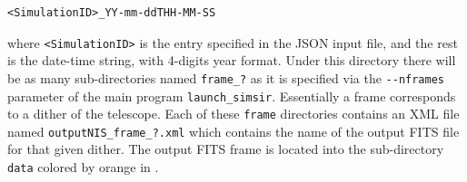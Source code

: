 \begin{verbatim}
<SimulationID>_YY-mm-ddTHH-MM-SS
\end{verbatim}

where \verb+<SimulationID>+ is the entry specified in the JSON input file, and the rest is the date-time string, with 4-digits year format. Under this directory there will be as many sub-directories named \verb+frame_?+ as it is specified via the \verb+--nframes+ parameter of the main program \verb+launch_simsir+. Essentially a frame corresponds to a dither of the telescope. Each of these \verb+frame+ directories contains an XML file named \verb+outputNIS_frame_?.xml+ which contains the name of the output FITS file for that given dither. The output FITS frame is located into the sub-directory \verb+data+ colored by orange in .